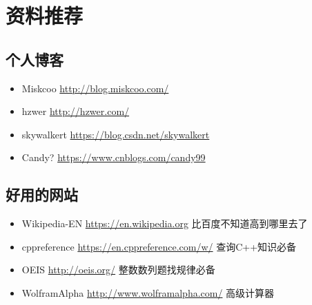 \chapter{资料推荐}
\section{个人博客}
\begin{itemize}
	\item Miskcoo \url{http://blog.miskcoo.com/}
	\item hzwer \url{http://hzwer.com/}
    \item skywalkert \url{https://blog.csdn.net/skywalkert}
    \item Candy? \url{https://www.cnblogs.com/candy99}
\end{itemize}
\section{好用的网站}
\begin{itemize}
    \item Wikipedia-EN \url{https://en.wikipedia.org} 比百度不知道高到哪里去了
    \item cppreference \url{https://en.cppreference.com/w/} 查询C++知识必备
    \item OEIS \url{http://oeis.org/} 整数数列题找规律必备
    \item WolframAlpha \url{http://www.wolframalpha.com/} 高级计算器
\end{itemize}

